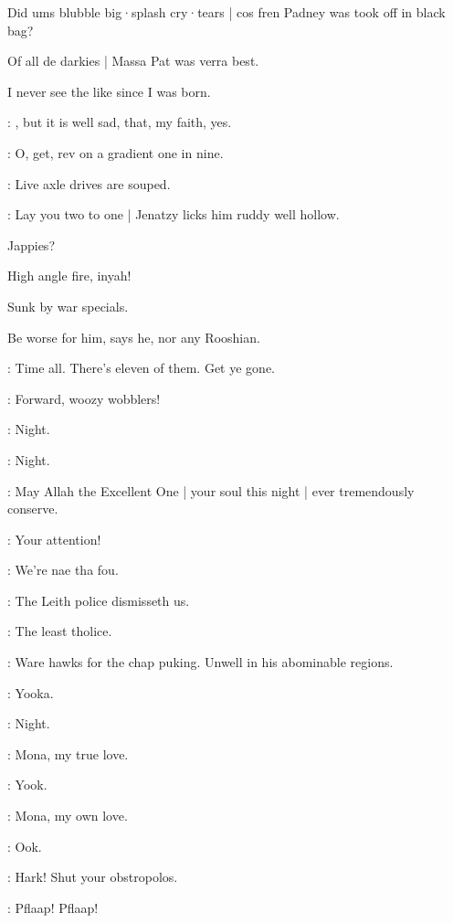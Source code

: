 \begin{omitted}
Did ums blubble big·splash cry·tears |
cos fren Padney was took off in black bag?

Of all de darkies |
Massa Pat was verra best.

I never see the like since I was born.
\end{omitted}

\dixon:
,
but it is well sad,
that,
my faith,
yes.

\stephen:
O,
get,
rev on a gradient one in nine.

\lynch:
Live axle drives are souped.

\lenehan:
Lay you two to one |
Jenatzy licks him ruddy well hollow.

\begin{omitted}
Jappies?

High angle fire,
inyah!

Sunk by war specials.

Be worse for him,
says he,
nor any Rooshian.
\end{omitted}

\barman:
Time all.
There's eleven of them.
Get ye gone.

\lenehan:
Forward,
woozy wobblers!

\lynch:
Night.

\punch:
Night.

\dixon:
May Allah the Excellent One |
your soul this night |
ever tremendously conserve.


\lenehan:
Your attention!

\crotthers:
We're nae tha fou.

\lynch:
The Leith police dismisseth us.

\crotthers:
The least tholice.

\punch:
Ware hawks for the chap puking.
Unwell in his abominable regions.

\bystander:
Yooka.

\dixon:
Night.

\crotthers:
Mona,
my true love.

\bystander:
Yook.

\crotthers:
Mona,
my own love.

\bystander:
Ook.


\lynch:
Hark!
Shut your obstropolos.

\bystander:
Pflaap!
Pflaap!

